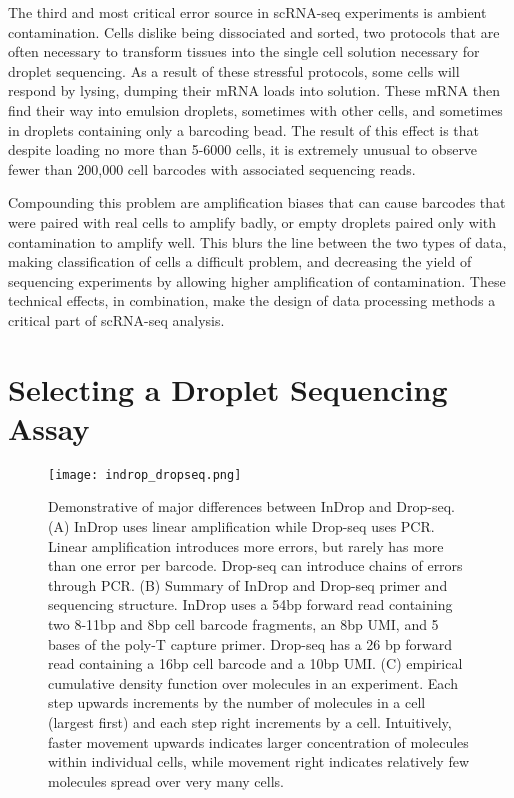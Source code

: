 The third and most critical error source in scRNA-seq experiments is ambient contamination.
Cells dislike being dissociated and sorted, two protocols that are often necessary to transform tissues into the single cell solution necessary for droplet sequencing. 
As a result of these stressful protocols, some cells will respond by lysing, dumping their mRNA loads into solution. 
These mRNA then find their way into emulsion droplets, sometimes with other cells, and sometimes in droplets containing only a barcoding bead. 
The result of this effect is that despite loading no more than 5-6000 cells, it is extremely unusual to observe fewer than 200,000 cell barcodes with associated sequencing reads.

Compounding this problem are amplification biases that can cause barcodes that were paired with real cells to amplify badly, or empty droplets paired only with contamination to amplify well. 
This blurs the line between the two types of data, making classification of cells a difficult problem, and decreasing the yield of sequencing experiments by allowing higher amplification of contamination. 
These technical effects, in combination, make the design of data processing methods a critical part of scRNA-seq analysis. 

\section{Selecting a Droplet Sequencing Assay}

\begin{figure}
\centering
\texttt{[image: indrop\_dropseq.png]}
\caption{Demonstrative of major differences between InDrop and Drop-seq. (A) InDrop uses linear amplification while Drop-seq uses PCR\@. Linear amplification introduces more errors, but rarely has more than one error per barcode. Drop-seq can introduce chains of errors through PCR\@. (B) Summary of InDrop and Drop-seq primer and sequencing structure. InDrop uses a 54bp forward read containing two 8-11bp and 8bp cell barcode fragments, an 8bp UMI, and 5 bases of the poly-T capture primer. Drop-seq has a 26 bp forward read containing a 16bp cell barcode and a 10bp UMI\@. (C) empirical cumulative density function over molecules in an experiment. Each step upwards increments by the number of molecules in a cell (largest first) and each step right increments by a cell. Intuitively, faster movement upwards indicates larger concentration of molecules within individual cells, while movement right indicates relatively few molecules spread over very many cells.}
\label{fig:indrop-dropseq}
\end{figure} 

